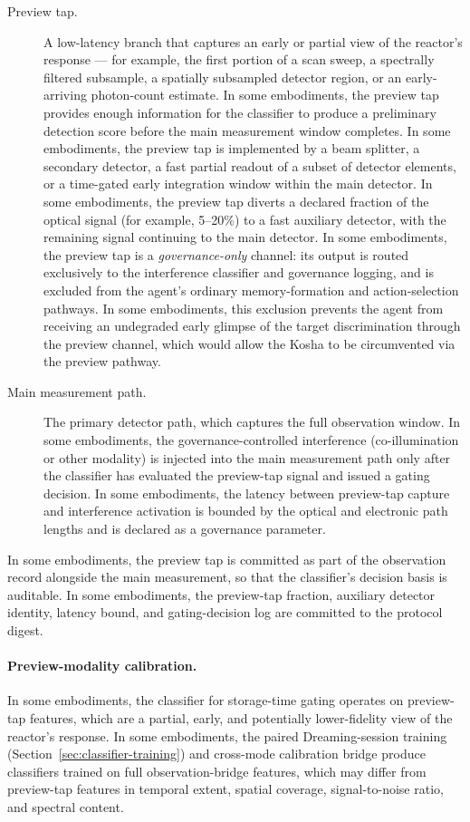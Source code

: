 \documentclass[a4paper,12pt]{article}
\begin{document}
\begin{description}
  \item[Preview tap.] A low-latency branch that captures an early or
    partial view of the reactor's response --- for example, the first
    portion of a scan sweep, a spectrally filtered subsample, a
    spatially subsampled detector region, or an early-arriving
    photon-count estimate. In some embodiments, the preview tap
    provides enough information for the classifier to produce a
    preliminary detection score before the main measurement window
    completes. In some embodiments, the preview tap is implemented
    by a beam splitter, a secondary detector, a fast partial readout
    of a subset of detector elements, or a time-gated early
    integration window within the main detector. In some embodiments,
    the preview tap diverts a declared fraction of the optical signal
    (for example, 5--20\%) to a fast auxiliary detector, with the
    remaining signal continuing to the main detector. In some
    embodiments, the preview tap is a \emph{governance-only} channel:
    its output is routed exclusively to the interference classifier
    and governance logging, and is excluded from the agent's ordinary
    memory-formation and action-selection pathways. In some
    embodiments, this exclusion prevents the agent from receiving an
    undegraded early glimpse of the target discrimination through the
    preview channel, which would allow the Kosha to be circumvented
    via the preview pathway.
  \item[Main measurement path.] The primary detector path, which
    captures the full observation window. In some embodiments, the
    governance-controlled interference (co-illumination or other
    modality) is injected into the main measurement path only after
    the classifier has evaluated the preview-tap signal and issued
    a gating decision. In some embodiments, the latency between
    preview-tap capture and interference activation is bounded by the
    optical and electronic path lengths and is declared as a
    governance parameter.
\end{description}

In some embodiments, the preview tap is committed as part of the
observation record alongside the main measurement, so that the
classifier's decision basis is auditable. In some embodiments, the
preview-tap fraction, auxiliary detector identity, latency bound,
and gating-decision log are committed to the protocol digest.

\paragraph{Preview-modality calibration.}
In some embodiments, the classifier for storage-time gating operates
on preview-tap features, which are a partial, early, and potentially
lower-fidelity view of the reactor's response. In some embodiments,
the paired Dreaming-session training
(Section~\ref{sec:classifier-training}) and cross-mode calibration
bridge produce classifiers trained on full observation-bridge
features, which may differ from preview-tap features in temporal
extent, spatial coverage, signal-to-noise ratio, and spectral
content.
\end{document}
